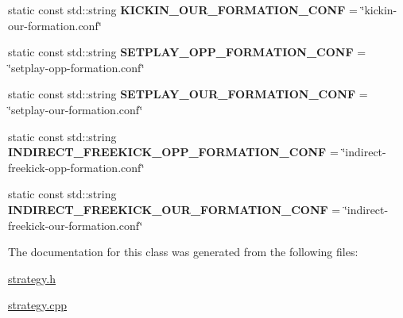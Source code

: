 \begin{DoxyCompactItemize}
\item 
\hypertarget{classStrategy_ada9b5c0a838ed359699fe16ff297a4ca}{
static const std::string {\bfseries KICKIN\_\-OUR\_\-FORMATION\_\-CONF} = \char`\"{}kickin-\/our-\/formation.conf\char`\"{}}
\label{classStrategy_ada9b5c0a838ed359699fe16ff297a4ca}

\item 
\hypertarget{classStrategy_aaf5a083a27323b29e7e1440cc9e16bf6}{
static const std::string {\bfseries SETPLAY\_\-OPP\_\-FORMATION\_\-CONF} = \char`\"{}setplay-\/opp-\/formation.conf\char`\"{}}
\label{classStrategy_aaf5a083a27323b29e7e1440cc9e16bf6}

\item 
\hypertarget{classStrategy_a7220aab488d2ea1d5492893d6d3cae69}{
static const std::string {\bfseries SETPLAY\_\-OUR\_\-FORMATION\_\-CONF} = \char`\"{}setplay-\/our-\/formation.conf\char`\"{}}
\label{classStrategy_a7220aab488d2ea1d5492893d6d3cae69}

\item 
\hypertarget{classStrategy_a9263b1a870e1fc3e73ad22f9fd617bb4}{
static const std::string {\bfseries INDIRECT\_\-FREEKICK\_\-OPP\_\-FORMATION\_\-CONF} = \char`\"{}indirect-\/freekick-\/opp-\/formation.conf\char`\"{}}
\label{classStrategy_a9263b1a870e1fc3e73ad22f9fd617bb4}

\item 
\hypertarget{classStrategy_aa03ab3bf6235fb2458b6a609373493d4}{
static const std::string {\bfseries INDIRECT\_\-FREEKICK\_\-OUR\_\-FORMATION\_\-CONF} = \char`\"{}indirect-\/freekick-\/our-\/formation.conf\char`\"{}}
\label{classStrategy_aa03ab3bf6235fb2458b6a609373493d4}

\end{DoxyCompactItemize}


The documentation for this class was generated from the following files:\begin{DoxyCompactItemize}
\item 
\hyperlink{strategy_8h}{strategy.h}\item 
\hyperlink{strategy_8cpp}{strategy.cpp}\end{DoxyCompactItemize}

